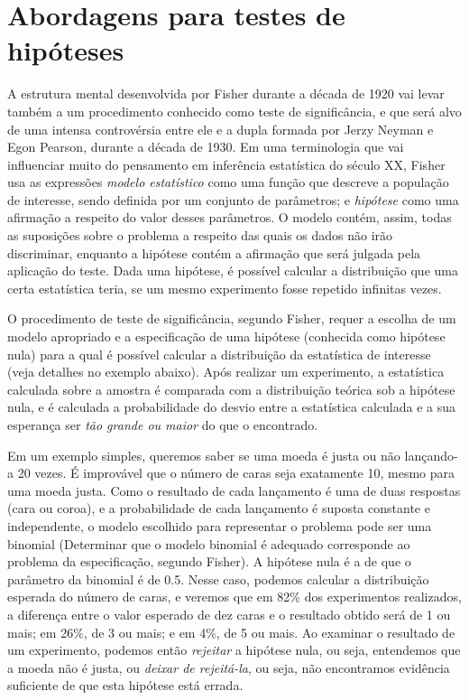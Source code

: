 \section{Abordagens para testes de hipóteses}
A estrutura mental desenvolvida por Fisher durante a década de 1920 vai levar também a um procedimento conhecido como teste de 
significância, e que será alvo de uma intensa controvérsia entre ele e a dupla formada por Jerzy Neyman e Egon Pearson, 
durante a década de 1930. Em uma terminologia que vai influenciar muito do pensamento em inferência estatística do século XX,
Fisher usa as expressões {\em modelo estatístico} como uma função que descreve a população de interesse, sendo definida 
por um conjunto de parâmetros; e {\em hipótese} como uma afirmação a respeito do valor desses parâmetros. O modelo contém, 
assim, todas as suposições sobre o problema a respeito das quais os dados não irão discriminar, enquanto a hipótese
contém a afirmação que será julgada pela aplicação do teste. Dada uma hipótese, é possível
calcular a distribuição que uma certa estatística teria, se um mesmo experimento fosse repetido infinitas vezes.

O procedimento de teste de significância, segundo Fisher, requer a escolha de um modelo apropriado e a especificação de uma 
hipótese (conhecida como hipótese nula) para a qual é possível
calcular a distribuição da estatística de interesse (veja detalhes no exemplo abaixo).
Após realizar um experimento, a estatística calculada sobre a amostra é comparada com a distribuição teórica sob a hipótese nula,
e é calculada a probabilidade do desvio entre a estatística calculada e a sua esperança ser {\em tão grande ou maior} do que o
encontrado. 

Em um exemplo simples, queremos saber se uma moeda é justa ou não lançando-a 20 vezes. É improvável que o número de caras seja
exatamente 10, mesmo para uma moeda justa. Como o resultado de cada lançamento é uma de duas respostas (cara ou coroa), 
e a probabilidade de cada lançamento é suposta constante e independente, o modelo escolhido para representar o problema
pode ser uma binomial (Determinar que o modelo binomial é adequado corresponde ao problema da especificação,
segundo Fisher).
A hipótese nula é a de que o parâmetro da binomial é de 0.5. Nesse caso, podemos calcular a 
distribuição esperada do número de caras, e veremos que em 82\% dos experimentos realizados, a diferença entre o valor esperado
de dez caras e o resultado obtido será de 1 ou mais; em 26\%, de 3 ou mais; e em 4\%, de 5 ou mais. Ao examinar o resultado 
de um experimento, podemos então {\em rejeitar} a hipótese nula, ou seja, entendemos que a moeda não é justa, ou {\em deixar
de rejeitá-la}, ou seja, não encontramos evidência suficiente de que esta hipótese está errada.


